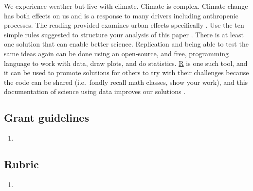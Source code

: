 \documentclass[
]{book}
\providecommand{\tightlist}{%
  \setlength{\itemsep}{0pt}\setlength{\parskip}{0pt}}
\begin{document}
We experience weather but live with climate. Climate is complex. Climate change has both effects on us and is a response to many drivers including anthropenic processes. The reading provided examines urban effects specifically \citep{RN5995}. Use the ten simple rules suggested to structure your analysis of this paper \citep{RN6861}. There is at least one solution that can enable better science. Replication and being able to test the same ideas again can be done using an open-source, and free, programming language to work with data, draw plots, and do statistics. \href{https://www.r-project.org}{R} is one such tool, and it can be used to promote solutions for others to try with their challenges because the code can be shared (i.e.~fondly recall math classes, show your work), and this documentation of science using data improves our solutions \citep{RN4523}.

\hypertarget{grant-guidelines}{%
\subsection*{Grant guidelines}\label{grant-guidelines}}

\begin{enumerate}
\def\labelenumi{\arabic{enumi}.}
\tightlist
\item
\end{enumerate}

\hypertarget{rubric-1}{%
\subsection*{Rubric}\label{rubric-1}}

\begin{enumerate}
\def\labelenumi{\arabic{enumi}.}
\tightlist
\item
\end{enumerate}

  
\end{document}
